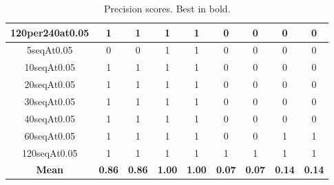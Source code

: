 \documentclass[12pt]{article}
\begin{document}
\begin{table}[]
\begin{tabular}{|c|cc|cc|cc|cc|}
        120per240at0.05 & 1                           & 1                          & 1                           & 1                          & 0                           & 0                          & 0                           & 0                          \\ \hline
        5seqAt0.05      & 0                           & 0                          & 1                           & 1                          & 0                           & 0                          & 0                           & 0                          \\
        10seqAt0.05     & 1                           & 1                          & 1                           & 1                          & 0                           & 0                          & 0                           & 0                          \\
        20seqAt0.05     & 1                           & 1                          & 1                           & 1                          & 0                           & 0                          & 0                           & 0                          \\
        30seqAt0.05     & 1                           & 1                          & 1                           & 1                          & 0                           & 0                          & 0                           & 0                          \\
        40seqAt0.05     & 1                           & 1                          & 1                           & 1                          & 0                           & 0                          & 0                           & 0                          \\
        60seqAt0.05     & 1                           & 1                          & 1                           & 1                          & 0                           & 0                          & 1                           & 1                          \\
        120seqAt0.05    & 1                           & 1                          & 1                           & 1                          & 1                           & 1                          & 1                           & 1                          \\ \hline
        \textbf{Mean}   & \textbf{0.86}               & \textbf{0.86}              & \textbf{1.00}               & \textbf{1.00}              & \textbf{0.07}               & \textbf{0.07}              & \textbf{0.14}               & \textbf{0.14}             \\ \hline
    \end{tabular}
    \caption{Precision scores. Best in bold.}
\end{table}
\end{document}
